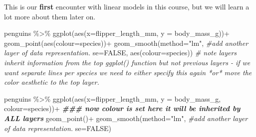 \documentclass[
]{book}
\newenvironment{Shaded}{\begin{snugshade}}{\end{snugshade}}
\newcommand{\AttributeTok}[1]{\textcolor[rgb]{0.77,0.63,0.00}{#1}}
\newcommand{\CommentTok}[1]{\textcolor[rgb]{0.56,0.35,0.01}{\textit{#1}}}
\newcommand{\ConstantTok}[1]{\textcolor[rgb]{0.00,0.00,0.00}{#1}}
\newcommand{\DocumentationTok}[1]{\textcolor[rgb]{0.56,0.35,0.01}{\textbf{\textit{#1}}}}
\newcommand{\FunctionTok}[1]{\textcolor[rgb]{0.00,0.00,0.00}{#1}}
\newcommand{\NormalTok}[1]{#1}
\newcommand{\SpecialCharTok}[1]{\textcolor[rgb]{0.00,0.00,0.00}{#1}}
\newcommand{\StringTok}[1]{\textcolor[rgb]{0.31,0.60,0.02}{#1}}
\begin{document}
This is our \textbf{first} encounter with linear models in this course, but we will learn a lot more about them later on.

\begin{Shaded}
\begin{Highlighting}[]
\NormalTok{penguins }\SpecialCharTok{\%\textgreater{}\%} 
  \FunctionTok{ggplot}\NormalTok{(}\FunctionTok{aes}\NormalTok{(}\AttributeTok{x=}\NormalTok{flipper\_length\_mm, }
             \AttributeTok{y =}\NormalTok{ body\_mass\_g))}\SpecialCharTok{+}
  \FunctionTok{geom\_point}\NormalTok{(}\FunctionTok{aes}\NormalTok{(}\AttributeTok{colour=}\NormalTok{species))}\SpecialCharTok{+}
  \FunctionTok{geom\_smooth}\NormalTok{(}\AttributeTok{method=}\StringTok{"lm"}\NormalTok{,    }\CommentTok{\#add another layer of data representation.}
              \AttributeTok{se=}\ConstantTok{FALSE}\NormalTok{,}
              \FunctionTok{aes}\NormalTok{(}\AttributeTok{colour=}\NormalTok{species)) }\CommentTok{\# note layers inherit information from the top ggplot() function but not previous layers {-} if we want separate lines per species we need to either specify this again *or* move the color aesthetic to the top layer. }
\end{Highlighting}
\end{Shaded}

\begin{Shaded}
\begin{Highlighting}[]
\NormalTok{penguins }\SpecialCharTok{\%\textgreater{}\%} 
  \FunctionTok{ggplot}\NormalTok{(}\FunctionTok{aes}\NormalTok{(}\AttributeTok{x=}\NormalTok{flipper\_length\_mm, }
             \AttributeTok{y =}\NormalTok{ body\_mass\_g,}
             \AttributeTok{colour=}\NormalTok{species))}\SpecialCharTok{+} \DocumentationTok{\#\#\# now colour is set here it will be inherited by ALL layers}
  \FunctionTok{geom\_point}\NormalTok{()}\SpecialCharTok{+}
  \FunctionTok{geom\_smooth}\NormalTok{(}\AttributeTok{method=}\StringTok{"lm"}\NormalTok{,    }\CommentTok{\#add another layer of data representation.}
              \AttributeTok{se=}\ConstantTok{FALSE}\NormalTok{)}
\end{Highlighting}
\end{Shaded}
\end{document}

